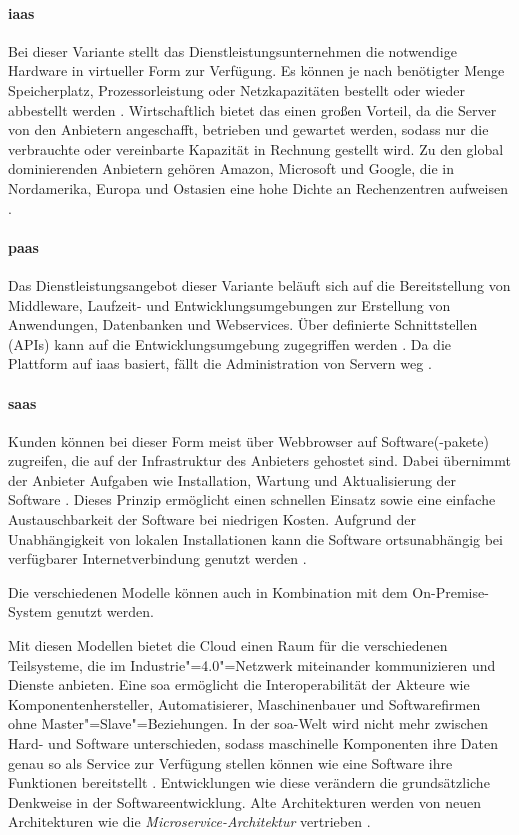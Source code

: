 \paragraph{\ac{iaas}} Bei dieser Variante stellt das Dienstleistungsunternehmen die notwendige Hardware in virtueller Form zur Verfügung. Es können je nach benötigter Menge Speicherplatz, Prozessorleistung oder Netzkapazitäten bestellt oder wieder abbestellt werden \citep{Dzombeta2017}. Wirtschaftlich bietet das einen großen Vorteil, da die Server von den Anbietern angeschafft, betrieben und gewartet werden, sodass nur die verbrauchte oder vereinbarte Kapazität in Rechnung gestellt wird. Zu den global dominierenden Anbietern gehören Amazon, Microsoft und Google, die in Nordamerika, Europa und Ostasien eine hohe Dichte an Rechenzentren aufweisen \citep{Acharya2019}.

\paragraph{\ac{paas}} Das Dienstleistungsangebot dieser Variante beläuft sich auf die Bereitstellung von Middleware, Laufzeit- und Entwicklungsumgebungen zur Erstellung von Anwendungen, Datenbanken und Webservices. Über definierte Schnittstellen (APIs) kann auf die Entwicklungsumgebung zugegriffen werden \citep{Dzombeta2017}. Da die Plattform auf \ac{iaas} basiert, fällt die Administration von Servern weg \citep{Acharya2019}.

\paragraph{\ac{saas}} Kunden können bei dieser Form meist über Webbrowser auf Software(-pakete) zugreifen, die auf der Infrastruktur des Anbieters gehostet sind. Dabei übernimmt der Anbieter Aufgaben wie Installation, Wartung und Aktualisierung der Software \citep{Utecht2018}. Dieses Prinzip ermöglicht einen schnellen Einsatz sowie eine einfache Austauschbarkeit der Software bei niedrigen Kosten. Aufgrund der Unabhängigkeit von lokalen Installationen kann die Software ortsunabhängig bei verfügbarer Internetverbindung genutzt werden \citep{Dzombeta2017}.

\vspace{0.5cm}
\noindent Die verschiedenen Modelle können auch in Kombination mit dem On-Premise-System genutzt werden.

\noindent Mit diesen Modellen bietet die Cloud einen Raum für die verschiedenen Teilsysteme, die im Industrie"=4.0"=Netzwerk miteinander kommunizieren und Dienste anbieten. Eine \acf{soa} ermöglicht die Interoperabilität der Akteure wie Komponentenhersteller, Automatisierer, Maschinenbauer und Softwarefirmen ohne Master"=Slave"=Beziehungen. In der \ac{soa}-Welt wird nicht mehr zwischen Hard- und Software unterschieden, sodass maschinelle Komponenten ihre Daten genau so als Service zur Verfügung stellen können wie eine Software ihre Funktionen bereitstellt \citep{Adolphs2017}. Entwicklungen wie diese verändern die grundsätzliche Denkweise in der Softwareentwicklung. Alte Architekturen werden von neuen Architekturen wie die \textit{Microservice-Architektur} vertrieben \citep{Acharya2019}.

